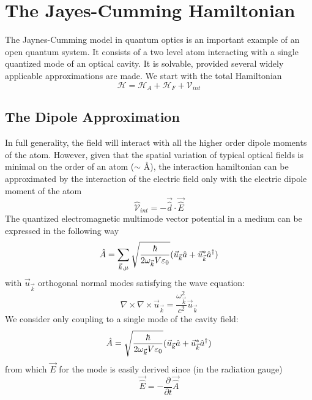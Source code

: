 
\section{The Jayes-Cumming Hamiltonian}
The Jaynes-Cumming model in quantum optics is an important example of an open quantum system. It consists of a two level atom interacting with a single quantized mode of an optical cavity. It is solvable, provided several widely applicable approximations are made. 
We start with the total Hamiltonian
\begin{equation}
	\mathscr{H} = \mathscr{H}_A + \mathscr{H}_F +\mathscr{V}_{int}
\end{equation}
\subsection{The Dipole Approximation}
In full generality, the field will interact with all the higher order dipole moments of the atom. However, given that the spatial variation of typical optical fields is minimal on the order of an atom ($\sim$ \AA), the interaction hamiltonian can be approximated by the interaction of the electric field only with the electric dipole moment of the atom 
\begin{equation}
	\hat{\mathscr{V}}_{int} = -\vec{\hat{d}} \cdot \vec{\hat{E}}
\end{equation}
The quantized electromagnetic multimode vector potential in a medium can be expressed in the following way \autocite[271--273]{Novotny2006}
\begin{equation}
	\hat{A} = \sum_{\vec{k}, \mu} \sqrt{\frac{\hbar}{2\omega_{\vec{k}} V \varepsilon_0}} (\vec{u}_{\vec{k}} \hat{a} + \vec{u}^*_{\vec{k}} \hat{a}^\dagger )
\end{equation}
with $\vec{u}_{\vec{k}}$ orthogonal normal modes satisfying the wave equation:
\begin{equation}
	\nabla \times \nabla \times \vec{u}_{\vec{k}} = \frac{\omega_{\vec{k}}^2}{c^2}  \vec{u}_{\vec{k}}
\end{equation}
We consider only coupling to a single mode of the cavity field:
\begin{equation}
	\hat{A} =  \sqrt{\frac{\hbar}{2\omega_{\vec{k}} V \varepsilon_0}} (\vec{u}_{\vec{k}} \hat{a} + \vec{u}^*_{\vec{k}} \hat{a}^\dagger )
\end{equation}
from which $\vec{E}$ for the mode is easily derived since (in the radiation gauge)
\begin{equation}
	\vec{\hat{E}} = -\frac{\partial}{\partial t}\vec{\hat{A}}
\end{equation}
